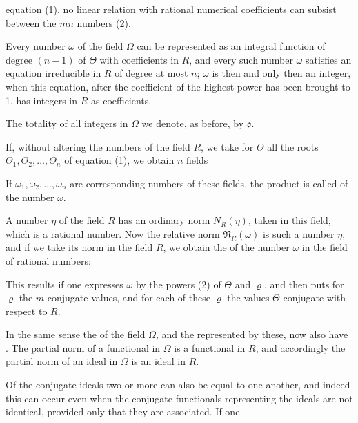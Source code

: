 equation (1), no linear relation with rational numerical coefficients can subsist between the $mn$ numbers (2).

Every number $\omega$ of the field $\Omega$ can be represented as an integral function of degree $(n-1)$ of $\Theta$ with coefficients in $R$, and every such number $\omega$ satisfies an equation irreducible in $R$ of degree at most $n$; $\omega$ is then and only then an integer, when this equation, after the coefficient of the highest power has been brought to 1, has integers in $R$ as coefficients.

The totality of all integers in $\Omega$ we denote, as before, by $\mathfrak{o}$.

If, without altering the numbers of the field $R$, we take for $\Theta$ all the roots $\Theta_1, \Theta_2, \ldots, \Theta_n$ of equation (1), we obtain $n$ fields

If $\omega_1, \omega_2, \ldots, \omega_n$ are corresponding numbers of these fields, the product
is called  of the number $\omega$.

A number $\eta$ of the field $R$ has an ordinary norm $N_R(\eta)$, taken in this field, which is a rational number. Now the relative norm $\mathfrak{N}_R(\omega)$ is such a number $\eta$, and if we take its norm in the field $R$, we obtain the  of the number $\omega$ in the field of rational numbers:

This results if one expresses $\omega$ by the powers (2) of $\Theta$ and $\varrho$, and then puts for $\varrho$ the $m$ conjugate values, and for each of these $\varrho$ the values $\Theta$ conjugate with respect to $R$.

In the same sense the  of the field $\Omega$, and the  represented by these, now also have . The partial norm of a functional in $\Omega$ is a functional in $R$, and accordingly the partial norm of an ideal in $\Omega$ is an ideal in $R$.

Of the conjugate ideals two or more can also be equal to one another, and indeed this can occur even when the conjugate functionals representing the ideals are not identical, provided only that they are associated. If one
